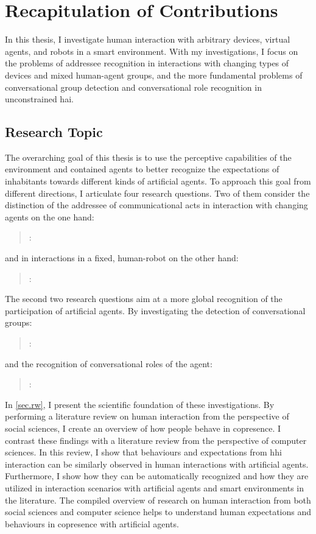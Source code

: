 \chapter{Recapitulation of Contributions}\label{ch.conclusion}

In this thesis, I investigate human interaction with arbitrary \glspl{device}, \glspl{virtual agent}, and \glspl{robot} in a \gls{smart environment}.
With my investigations, I focus on the problems of \gls{addressee} recognition in interactions with changing types of \glspl{device} and mixed human-agent groups, and the more fundamental problems of \gls{conversational group} detection and \gls{conversational role} recognition in unconstrained \gls{hai}.

\section{Research Topic}
The overarching goal of this thesis is to use the perceptive capabilities of the environment and contained agents to better recognize the  expectations of inhabitants towards different kinds of \glspl{artificial agent}.
To approach this goal from different directions, I articulate four research questions.
Two of them consider the distinction of the \gls{addressee} of communicational acts in interaction with changing agents on the one hand:
\blockquote{: \hypaddress}
and in interactions in a fixed,  human-\gls{robot}  on the other hand:
\blockquote{: \hypmeka}.
The second two research questions aim at a more global recognition of the  participation of \glspl{artificial agent}.
By investigating the detection of \glspl{conversational group}:
\blockquote{: \hypfformation}
 and the recognition of \glspl{conversational role} of the agent:
\blockquote{: \hyproles}.
In \cref{sec.rw}, I present the scientific foundation of these investigations.
By performing a literature review on human interaction from the perspective of social sciences, I create an overview of how people behave in \gls{copresence}.
I contrast these findings with a literature review from the perspective of computer sciences. 
In this review, I show that behaviours and expectations from \gls{hhi} interaction can be similarly observed in human interactions with \glspl{artificial agent}.
Furthermore, I show how they can be automatically recognized and how they are utilized in interaction scenarios with \glspl{artificial agent} and \glspl{smart environment} in the literature.
The compiled overview of research on human interaction from both social sciences and computer science helps to understand human expectations and behaviours in \gls{copresence} with \glspl{artificial agent}.

